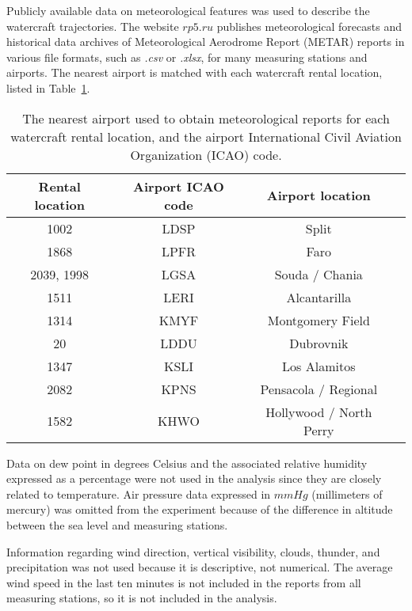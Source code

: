 \documentclass[preprint,12pt]{elsarticle}
\begin{document}
Publicly available data on meteorological features was used to describe the watercraft trajectories. The website $rp5.ru$ \cite{rp5Description} publishes meteorological forecasts and historical data archives of Meteorological Aerodrome Report (METAR) reports in various file formats, such as \textit{.csv} or \textit{.xlsx}, for many measuring stations and airports. The nearest airport is matched with each watercraft rental location, listed in Table~\ref{tab:airport}.

\begin{table}[!ht]
    \centering
    \begin{tabular}{|c|c|c|c|}
        \hline
        Rental location & Airport ICAO code & Airport location \\ \hline
        1002 & LDSP & Split \\ \hline
        1868 & LPFR & Faro \\ \hline 
        2039, 1998 & LGSA & Souda / Chania \\ \hline
        1511 & LERI & Alcantarilla \\ \hline
        1314 & KMYF & Montgomery Field \\ \hline
        20 & LDDU & Dubrovnik \\ \hline
        1347 & KSLI & Los Alamitos \\ \hline
        2082 & KPNS & Pensacola / Regional \\ \hline
        1582 & KHWO & Hollywood / North Perry \\ \hline
    \end{tabular}
    \caption{The nearest airport used to obtain meteorological reports for each watercraft rental location, and the airport International Civil Aviation Organization (ICAO) code.}
    \label{tab:airport}
\end{table}

Data on dew point in degrees Celsius and the associated relative humidity expressed as a percentage were not used in the analysis since they are closely related to temperature. Air pressure data expressed in $mmHg$ (millimeters of mercury) was omitted from the experiment because of the difference in altitude between the sea level and measuring stations.

Information regarding wind direction, vertical visibility, clouds, thunder, and precipitation was not used because it is descriptive, not numerical. The average wind speed in the last ten minutes is not included in the reports from all measuring stations, so it is not included in the analysis.
\end{document}
